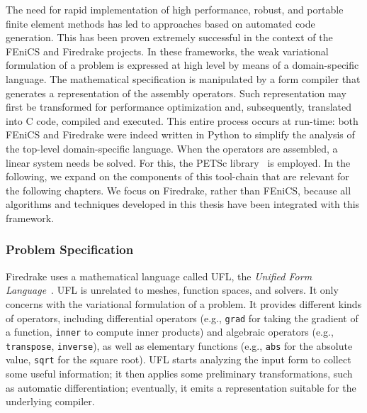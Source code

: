 The need for rapid implementation of high performance, robust, and portable finite element methods has led to approaches based on automated code generation. This has been proven extremely successful in the context of the FEniCS \citep{Fenics} and Firedrake \citep{firedrake-paper} projects. In these frameworks, the weak variational formulation of a problem is expressed at high level by means of a domain-specific language. The mathematical specification is manipulated by a form compiler that generates a representation of the assembly operators. Such representation may first be transformed for performance optimization and, subsequently, translated into C code, compiled and executed. This entire process occurs at run-time: both FEniCS and Firedrake were indeed written in Python to simplify the analysis of the top-level domain-specific language. When the operators are assembled, a linear system needs be solved. For this, the PETSc library~\citep{petsc-cite} is employed. In the following, we expand on the components of this tool-chain that are relevant for the following chapters. We focus on Firedrake, rather than FEniCS, because all algorithms and techniques developed in this thesis have been integrated with this framework.

\subsubsection{Problem Specification}
Firedrake uses a mathematical language called UFL, the {\em Unified Form Language}~\citep{ufl-cite}. UFL is unrelated to meshes, function spaces, and solvers. It only concerns with the variational formulation of a problem. It provides different kinds of operators, including differential operators (e.g., \texttt{grad} for taking the gradient of a function, \texttt{inner} to compute inner products) and algebraic operators (e.g., \texttt{transpose}, \texttt{inverse}), as well as elementary functions (e.g., \texttt{abs} for the absolute value, \texttt{sqrt} for the square root). UFL starts analyzing the input form to collect some useful information; it then applies some preliminary transformations, such as automatic differentiation; eventually, it emits a representation suitable for the underlying compiler.

